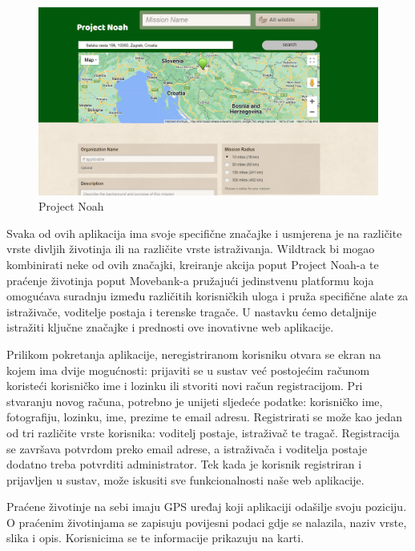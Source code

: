 \begin{packed_item}
\begin{figure}[H]
				\includegraphics[width=\textwidth]{slike/projectnoah.PNG} %
				\caption{Project Noah}
				\label{fig:projectnoah} %
			\end{figure}
			
		\end{packed_item}
		
		Svaka od ovih aplikacija ima svoje specifične značajke i usmjerena je na različite vrste divljih životinja ili na različite vrste istraživanja. Wildtrack bi mogao kombinirati neke od ovih značajki, kreiranje akcija poput Project Noah-a te praćenje životinja poput Movebank-a pružajući jedinstvenu platformu koja omogućava suradnju između različitih korisničkih uloga i pruža specifične alate za istraživače, voditelje postaja i terenske tragače. U nastavku ćemo detaljnije istražiti ključne značajke i prednosti ove inovativne web aplikacije.\newline
		
		Prilikom pokretanja aplikacije, neregistriranom korisniku otvara se ekran na kojem ima dvije mogućnosti: prijaviti se u sustav već postojećim računom koristeći korisničko ime i lozinku ili stvoriti novi račun registracijom. Pri stvaranju novog računa, potrebno je unijeti sljedeće podatke: korisničko ime, fotografiju, lozinku, ime, prezime te email adresu. Registrirati se može kao jedan od tri različite vrste korisnika: voditelj postaje, istraživač te tragač. Registracija se završava potvrdom preko email adrese, a istraživača i voditelja postaje dodatno treba potvrditi administrator. Tek kada je korisnik registriran i prijavljen u sustav, može iskusiti sve funkcionalnosti naše web aplikacije.\newline
		
		Praćene životinje na sebi imaju GPS uređaj koji aplikaciji odašilje svoju poziciju. O praćenim životinjama se zapisuju povijesni podaci gdje se nalazila, naziv vrste, slika i opis. Korisnicima se te informacije prikazuju na karti. \newline
		
